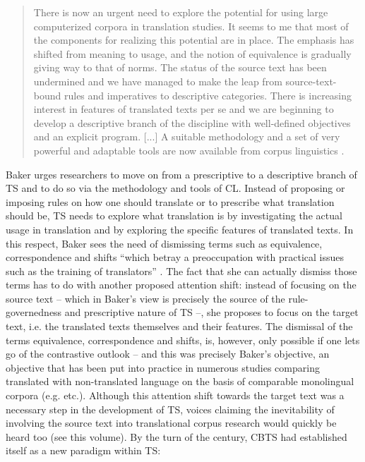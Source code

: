 \begin{quote}
There is now an urgent need to explore the potential for using large computerized corpora in translation studies. It seems to me that most of the components for realizing this potential are in place. The emphasis has shifted from meaning to usage, and the notion of equivalence is gradually giving way to that of norms. The status of the source text has been undermined and we have managed to make the leap from source-text-bound rules and imperatives to descriptive categories. There is increasing interest in features of translated texts per se and we are beginning to develop a descriptive branch of the discipline with well-defined objectives and an explicit program. [...] A suitable methodology and a set of very powerful and adaptable tools are now available from corpus linguistics \citep[248]{baker_corpus_1993}.
\end{quote}

Baker urges researchers to move on from a prescriptive to a descriptive branch of TS and to do so via the methodology and tools of CL. Instead of proposing or imposing rules on how one should translate or to prescribe what translation should be, TS needs to explore what translation is by investigating the actual usage in translation and by exploring the specific features of translated texts. In this respect, Baker sees the need of dismissing terms such as equivalence, correspondence and shifts “which betray a preoccupation with practical issues such as the training of translators” \citep[235]{baker_corpus_1993}. The fact that she can actually dismiss those terms has to do with another proposed attention shift: instead of focusing on the source text – which in Baker’s view is precisely the source of the rule-governedness and prescriptive nature of TS –, she proposes to focus on the target text, i.e. the translated texts themselves and their features. The dismissal of the terms equivalence, correspondence and shifts, is, however, only possible if one lets go of the contrastive outlook – and this was precisely Baker’s objective, an objective that has been put into practice in numerous studies comparing translated with non-translated language on the basis of comparable monolingual corpora (e.g. \citealt{laviosa_core_1998,olohan_reporting_2000,mutesayire_apposition_2004,xiao_how_2010} etc.). Although this attention shift towards the target text was a necessary step in the development of TS, voices claiming the inevitability of involving the source text into translational corpus research would quickly be heard too (see this volume). By the turn of the century, CBTS had established itself as a new paradigm within TS:

